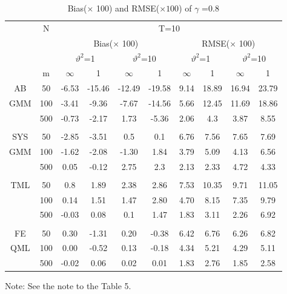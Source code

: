 \documentclass[12pt,a4paper,hyperref]{article}
\begin{document}
\begin{center}
\begin{table}[H]
\caption{Bias($\times$ 100) and RMSE($\times 100$) of $\gamma$ =0.8}  \label{table8}
\centering
\begin{tabular} {*{10}{c}}
\toprule
&N& \multicolumn{8}{c}{T=10}\\
\cmidrule(lr){3-10}
&& \multicolumn{4}{c}{Bias($\times$ 100)} & \multicolumn{4}{c}{RMSE($\times$ 100)}\\
  \cmidrule(lr){3-6} \cmidrule(lr){7-10}
&&  \multicolumn{2}{c}{$\vartheta^{2}$=1}&\multicolumn{2}{c}{$\vartheta^{2}$=10} & \multicolumn{2}{c}{$\vartheta^{2}$=1}&\multicolumn{2}{c}{$\vartheta^{2}$=10}\\
\cmidrule(lr){3-4} \cmidrule(lr){5-6}\cmidrule(lr){7-8}\cmidrule(lr){9-10}
& m & $\infty$ &1&$\infty$ &1&$\infty$ &1&$\infty$&1\\
\cmidrule(lr){3-4} \cmidrule(lr){5-6}\cmidrule(lr){7-8}\cmidrule(lr){9-10}
 AB&50 	&	-6.53		&-15.46&	-12.49	&-19.58	&9.14&	18.89&	16.94&	23.79 \\
 GMM &100 & -3.41& -9.36& -7.67&-14.56 & 5.66&12.45 &11.69 &18.86\\
&500 &	-0.73	&-2.17	&1.73&	-5.36&2.06&	4.3&3.87&8.55  \\
\midrule \\
\cmidrule(lr){3-4} \cmidrule(lr){5-6}\cmidrule(lr){7-8}\cmidrule(lr){9-10}
 SYS&50 &	-2.85	&-3.51	&0.5	&0.1	&	6.76	&7.56	&7.65&	7.69 \\
 GMM&100 & -1.62 &-2.08 & -1.30& 1.84&3.79 & 5.09& 4.13&6.56\\
 &500 &0.05&	-0.12&2.75&	2.3	&	2.13&2.33	&4.72	&4.33	\\
 \midrule \\
\cmidrule(lr){3-4} \cmidrule(lr){5-6}\cmidrule(lr){7-8}\cmidrule(lr){9-10}
TML &50 	&	0.8		&1.89	&	2.38	&2.86	&	7.53&10.35	&	9.71&	11.05 \\
&100& 0.14& 1.51&1.47 &2.80 & 4.70&8.15 & 7.35&9.79 \\
 &500 & 	-0.03&		0.08		&	0.1		&1.47	&	1.83	&3.11	&2.26	&	6.92  \\
 \midrule \\
\cmidrule(lr){3-4} \cmidrule(lr){5-6}\cmidrule(lr){7-8}\cmidrule(lr){9-10}
FE& 50 	&	0.30&	-1.31	&0.20	&-0.38&	6.42	&6.76&	6.26	&6.82
\\
 QML&100 & 0.00	&-0.52	&0.13&	-0.18&	4.34&	5.21&	4.29&	5.11
\\ 	
 &500 	&	-0.02	&0.06	&0.02&	0.01	&1.83	&2.76&	1.85&	2.58
 \\
\bottomrule
\end{tabular}
\begin{tablenotes}
      \small
      \item Note: See the note to the Table 5.
    \end{tablenotes}
\end{table}
\end{center}
\end{document}

